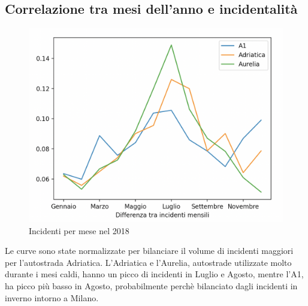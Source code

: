 \documentclass[a4paper]{report}
\begin{document}

\subsection{Correlazione tra mesi dell'anno e incidentalità}
\begin{figure}
    \includegraphics[width=\linewidth]{../src/incidenti/incidenti_aci/autostrade/mesi_autostrade.png}
    \caption{Incidenti per mese nel 2018}
    \label{fig:incidenti_per_mese}
\end{figure}

Le curve sono state normalizzate per bilanciare il volume di incidenti maggiori per 
l'autostrada Adriatica.
L'Adriatica e l'Aurelia, autostrade utilizzate molto durante i mesi caldi, hanno un picco di 
incidenti in Luglio e Agosto, mentre l'A1, ha picco più basso in Agosto, probabilmente 
perchè bilanciato dagli incidenti in inverno intorno a Milano.
\end{document}
